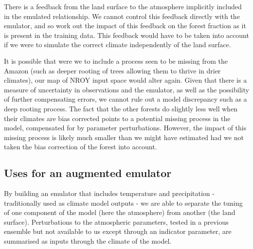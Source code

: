 \documentclass[gmd, manuscript]{copernicus}
\begin{document}
There is a feedback from the land surface to the atmosphere implicitly included in the emulated relationship. We cannot control this feedback directly with the emulator, and so work out the impact of this feedback on the forest fraction as it is present in the training data. This feedback would have to be taken into account if we were to simulate the correct climate independently of the land surface.

It is possible that were we to include a process seen to be missing from the Amazon (such as deeper rooting of trees allowing them to thrive in drier climates), our map of NROY input space would alter again. Given that there is a measure of uncertainty in observations and the emulator, as well as the possibility of further compensating errors, we cannot rule out a model discrepancy such as a deep rooting process. The fact that the other forests do slightly less well when their climates are bias corrected points to a potential missing process in the model, compensated for by parameter perturbations. However, the impact of this missing process is likely much smaller than we might have estimated had we not taken the bias correction of the forest into account.



\subsection{Uses for an augmented emulator}\label{ssec:uses}
By building an emulator that includes temperature and precipitation - traditionally used as climate model outputs - we are able to separate the tuning of one component of the model (here the atmosphere) from another (the land surface). Perturbations to the atmospheric parameters, tested in a previous ensemble but not available to us except through an indicator parameter, are summarised as inputs through the climate of the model.
\end{document}
